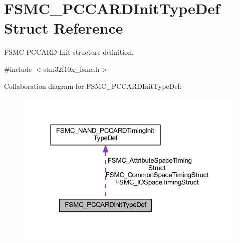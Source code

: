 \hypertarget{struct_f_s_m_c___p_c_c_a_r_d_init_type_def}{}\section{F\+S\+M\+C\+\_\+\+P\+C\+C\+A\+R\+D\+Init\+Type\+Def Struct Reference}
\label{struct_f_s_m_c___p_c_c_a_r_d_init_type_def}


F\+S\+MC P\+C\+C\+A\+RD Init structure definition.  




{\ttfamily \#include $<$stm32f10x\+\_\+fsmc.\+h$>$}



Collaboration diagram for F\+S\+M\+C\+\_\+\+P\+C\+C\+A\+R\+D\+Init\+Type\+Def\+:
\nopagebreak
\begin{figure}[H]
\begin{center}
\leavevmode
\includegraphics[width=317pt]{struct_f_s_m_c___p_c_c_a_r_d_init_type_def__coll__graph}
\end{center}
\end{figure}
